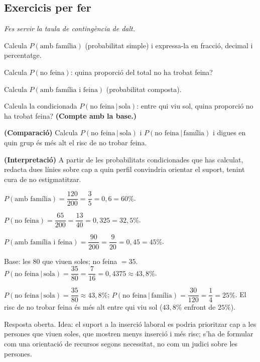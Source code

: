 \subsection{Exercicis per fer}

\noindent\textit{Fes servir la taula de contingència de dalt.}

\begin{exercicis}
\begin{exlist}
  \item Calcula $P(\text{amb família})$ (probabilitat simple) i expressa-la en fracció,
        decimal i percentatge.
  \item Calcula $P(\text{no feina})$: quina proporció del total no ha trobat feina?
  \item Calcula $P(\text{amb família i feina})$ (probabilitat composta).
  \item Calcula la condicionada $P(\text{no feina}\,|\,\text{sola})$: entre qui viu sol,
        quina proporció no ha trobat feina? \textbf{(Compte amb la base.)}
  \item \textbf{(Comparació)} Calcula $P(\text{no feina}\,|\,\text{sola})$ i
        $P(\text{no feina}\,|\,\text{família})$ i digues en quin grup és més alt el risc
        de no trobar feina.
  \item \textbf{(Interpretació)} A partir de les probabilitats condicionades que has
        calculat, redacta dues línies sobre cap a quin perfil convindria orientar el
        suport, tenint cura de no estigmatitzar.
\end{exlist}
\end{exercicis}

\begin{solucions}
\begin{sollist}
  \item $P(\text{amb família})=\dfrac{120}{200}=\dfrac{3}{5}=0,6=60\%$.
  \item $P(\text{no feina})=\dfrac{65}{200}=\dfrac{13}{40}=0,325=32,5\%$.
  \item $P(\text{amb família i feina})=\dfrac{90}{200}=\dfrac{9}{20}=0,45=45\%$.
  \item Base: les $80$ que viuen soles; no feina $=35$.
        $P(\text{no feina}\,|\,\text{sola})=\dfrac{35}{80}=\dfrac{7}{16}=0,4375\approx 43,8\%$.
  \item $P(\text{no feina}\,|\,\text{sola})=\dfrac{35}{80}\approx 43,8\%$;
        $P(\text{no feina}\,|\,\text{família})=\dfrac{30}{120}=\dfrac{1}{4}=25\%$. El risc
        de no trobar feina és més alt entre qui viu sol ($43,8\%$ enfront de $25\%$).
  \item Resposta oberta. Idea: el suport a la inserció laboral es podria prioritzar cap a
        les persones que viuen soles, que mostren menys inserció i més risc; s'ha de
        formular com una orientació de recursos segons necessitat, no com un judici sobre
        les persones.
\end{sollist}
\end{solucions}
